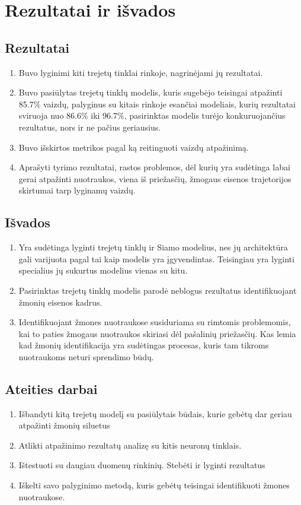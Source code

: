 \documentclass{VUMIFPSkursinis}
\begin{document}
\section{Rezultatai ir išvados}
\thispagestyle{empty} 
\subsection{Rezultatai}
\begin{enumerate}
\item{Buvo lyginimi kiti trejetų tinklai rinkoje, nagrinėjami jų rezultatai.}
\item{Buvo pasiūlytas trejetų tinklų modelis, kuris sugebėjo teisingai atpažinti 85.7\% vaizdų, palyginus su kitais rinkoje esančiai modeliais, kurių rezultatai sviruoja nuo 86.6\% iki 96.7\%, pasirinktas modelis turėjo konkuruojančius rezultatus, nors ir ne pačius geriausius.}
\item{Buvo išskirtos metrikos pagal ką reitinguoti vaizdų atpažinimą.}
\item{Aprašyti tyrimo rezultatai, rastos problemos, dėl kurių yra sudėtinga labai gerai atpažinti nuotraukos, viena iš priežasčių, žmogaus eisenos trajetorijos skirtumai tarp lyginamų vaizdų.}
\end{enumerate}
\subsection{Išvados}
\begin{enumerate}
\item{Yra sudėtinga lyginti trejetų tinklų ir Siamo modelius, nes jų architektūra gali varijuota pagal tai kaip modelis yra įgyvendintas. Teisingiau yra lyginti specialius jų sukurtus modelius vienas su kitu.}
\item{Pasirinktas trejetų tinklų modelis parodė neblogus rezultatus identifikuojant žmonių eisenos kadrus.}
\item{Identifikuojant žmones nuotraukose susiduriama su rimtomis problemomis, kai to paties žmogaus nuotraukos skiriasi dėl pašalinių priežasčių. Kas lemia kad žmonių identifikacija yra sudėtingas procesas, kuris tam tikroms nuotraukoms neturi sprendimo būdų.}
\end{enumerate}
\subsection{Ateities darbai}
\begin{enumerate}
\item{Išbandyti kitą trejetų modelį su pasiūlytais būdais, kurie gebėtų dar geriau atpažinti žmonių siluetus}
\item{Atlikti atpažinimo rezultatų analizę su kitis neuronų tinklais.}
\item{Ištestuoti su daugiau duomenų rinkinių. Stebėti ir lyginti rezultatus}
\item{Iškelti savo palyginimo metodą, kuris gebėtų teisingai identifikuoti žmones nuotraukose.}
\end{enumerate}
\pagebreak
\end{document}
